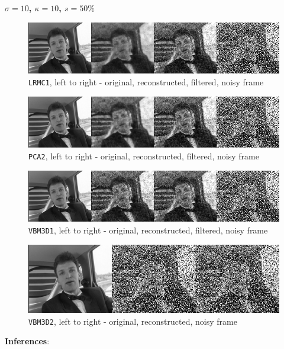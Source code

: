 \documentclass[fleqn, 11pt]{article}
\begin{document}
\newpage
\textbf{$\sigma = 10$, $\kappa = 10$, $s = 50\%$}
\begin{figure}[H]
    \centering
    \includegraphics[scale=0.7]{10_10_50_LRMC1.png}
    \caption{\texttt{LRMC1}, left to right - original, reconstructed, filtered, noisy frame}
\end{figure}
\begin{figure}[H]
    \centering
    \includegraphics[scale=0.7]{10_10_50_PCA2.png}
    \caption{\texttt{PCA2}, left to right - original, reconstructed, filtered, noisy frame}
\end{figure}
\begin{figure}[H]
    \centering
    \includegraphics[scale=0.7]{10_10_50_VBM3D1.png}
    \caption{\texttt{VBM3D1}, left to right - original, reconstructed, filtered, noisy frame}
\end{figure}
\begin{figure}[H]
    \centering
    \includegraphics[scale=0.7]{10_10_50_VBM3D2.png}
    \caption{\texttt{VBM3D2}, left to right - original, reconstructed, noisy frame}
\end{figure}

\newpage
\textbf{Inferences}:
\end{document}
